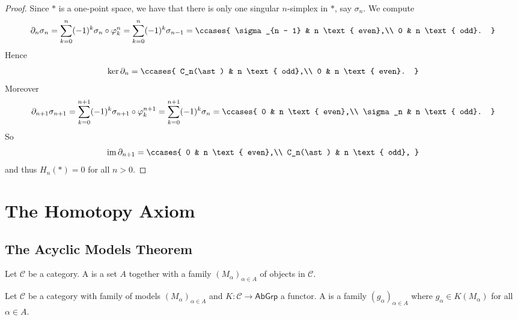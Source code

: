 \begin{proof}
	Since $\ast$ is a one-point space, we have that there is only one singular $n$-simplex in $\ast$, say $\sigma_n$. We compute
	\begin{equation*}
		\partial_n \sigma_n = \sum_{k = 0}^n(-1)^k \sigma_n \circ \varphi^n_k = \sum_{k = 0}^n (-1)^k\sigma_{n - 1} = \ccases{
			\sigma_{n - 1} & n \text{ even},\\
			0 & n \text{ odd}.
		}
	\end{equation*}
	Hence
	\begin{equation*}
		\ker \partial_n = \ccases{
			C_n(\ast) & n \text{ odd},\\
			0 & n \text{ even}.
		}
	\end{equation*}
	Moreover
	\begin{equation*}
		\partial_{n+1}\sigma_{n + 1} = \sum_{k = 0}^{n + 1}(-1)^k \sigma_{n + 1} \circ \varphi^{n+1}_k = \sum_{k = 0}^{n + 1} (-1)^k \sigma_n = \ccases{
			0 & n \text{ even},\\
			\sigma_n & n \text{ odd}.
		}
	\end{equation*}
	So
	\begin{equation*}
		\im \partial_{n + 1} = \ccases{
			0 & n \text{ even},\\
			C_n(\ast) & n \text{ odd},
		}
	\end{equation*}
	and thus $H_n(\ast) = 0$ for all $n > 0$.
\end{proof}

\section*{The Homotopy Axiom}
\subsection*{The Acyclic Models Theorem}
\begin{definition}[Models]
	Let $\mathcal{C}$ be a category. A  is a set $A$ together with a family $(M_\alpha)_{\alpha \in A}$ of objects in $\mathcal{C}$.
\end{definition}

\begin{definition}[$K$-Models]
	Let $\mathcal{C}$ be a category with family of models $(M_\alpha)_{\alpha \in A}$ and $K : \mathcal{C} \to \mathsf{AbGrp}$ a functor. A  is a family $(g_\alpha)_{\alpha \in A}$ where $g_\alpha \in K(M_\alpha)$ for all $\alpha \in A$.
\end{definition}

